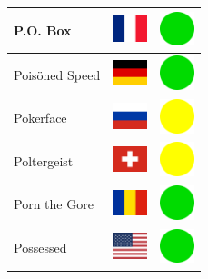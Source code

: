 \documentclass[12pt, a4paper, twoside]{report}
\begin{document}
\begin{center}
\begin{longtable}{|p{5cm}|p{2cm}|p{2cm}|}
P.O. Box & \includegraphics[width=1cm]{4x3/fr} & \includegraphics[width=1cm]{likes/y} \\ \hline
Poisöned Speed & \includegraphics[width=1cm]{4x3/de} & \includegraphics[width=1cm]{likes/y} \\ \hline
Pokerface & \includegraphics[width=1cm]{4x3/ru} & \includegraphics[width=1cm]{likes/m} \\ \hline
Poltergeist & \includegraphics[width=1cm]{4x3/ch} & \includegraphics[width=1cm]{likes/m} \\ \hline
Porn the Gore & \includegraphics[width=1cm]{4x3/ro} & \includegraphics[width=1cm]{likes/y} \\ \hline
Possessed & \includegraphics[width=1cm]{4x3/us} & \includegraphics[width=1cm]{likes/y} \\ \hline

\end{longtable}
\end{center}
\end{document}
